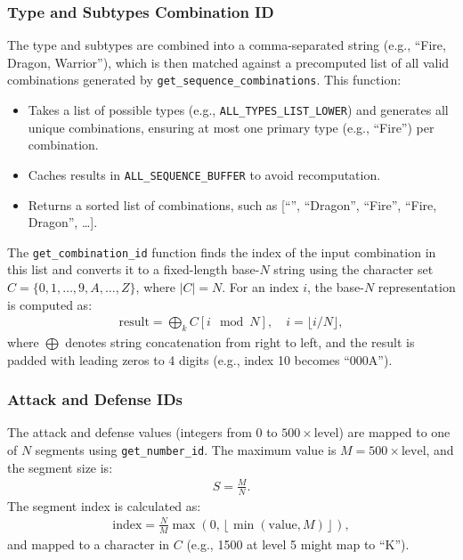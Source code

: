 \subsubsection{Type and Subtypes Combination ID}
The type and subtypes are combined into a comma-separated string (e.g., ``Fire, Dragon, Warrior''), which is then matched against a precomputed list of all valid combinations generated by \texttt{get\_sequence\_combinations}. This function:
\begin{itemize}
	\item Takes a list of possible types (e.g., \texttt{ALL\_TYPES\_LIST\_LOWER}) and generates all unique combinations, ensuring at most one primary type (e.g., ``Fire'') per combination.
	\item Caches results in \texttt{ALL\_SEQUENCE\_BUFFER} to avoid recomputation.
	\item Returns a sorted list of combinations, such as [``'', ``Dragon'', ``Fire'', ``Fire, Dragon'', \ldots].
\end{itemize}
The \texttt{get\_combination\_id} function finds the index of the input combination in this list and converts it to a fixed-length base-$N$ string using the character set $C = \{0, 1, \ldots, 9, A, \ldots, Z\}$, where $|C| = N$. For an index $i$, the base-$N$ representation is computed as:
\begin{align}
	\text{result} = \bigoplus_{k} C[i \mod N], \quad i = \lfloor i / N \rfloor,
\end{align}
where $\bigoplus$ denotes string concatenation from right to left, and the result is padded with leading zeros to 4 digits (e.g., index 10 becomes ``000A'').

\subsubsection{Attack and Defense IDs}
The attack and defense values (integers from 0 to $500 \times \text{level}$) are mapped to one of $N$ segments using \texttt{get\_number\_id}. The maximum value is $M = 500 \times \text{level}$, and the segment size is:
\begin{align}
S = \frac{M}{N}.
\end{align}
The segment index is calculated as:
\begin{align}
	\text{index} = \frac{N}{M}\max\left(0, \left\lfloor \min(\text{value}, M) \right\rfloor\right),
\end{align}
and mapped to a character in $C$ (e.g., 1500 at level 5 might map to ``K'').

